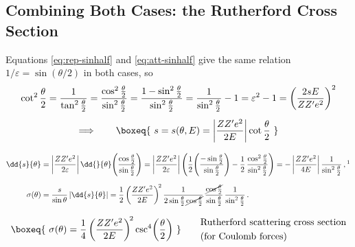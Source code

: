 \documentclass[11pt]{article}
\begin{document}
\subsection{Combining Both Cases: the Rutherford Cross Section}

Equations \eqref{eq:rep-sinhalf} and \eqref{eq:att-sinhalf} give the same
relation $1/\varepsilon = \sin(\theta/2)$ in both cases, so
\begin{gather}
\cot^{2}\frac{\theta}{2} = \frac{1}{\tan^{2}\frac{\theta}{2}}
 = \frac{\cos^{2}\frac{\theta}{2}}{\sin^{2}\frac{\theta}{2}}
 = \frac{1-\sin^{2}\frac{\theta}{2}}{\sin^{2}\frac{\theta}{2}}
 = \frac{1}{\sin^{2}\frac{\theta}{2}} - 1
 = \varepsilon^{2} - 1
 = \left(\frac{2sE}{Z Z' e^{2}}\right)^{2}\\[4pt]
\Longrightarrow\qquad
\boxeq{\ s = s(\theta,E) = \left\lvert \frac{Z Z' e^{2}}{2E}\right\rvert
   \cot\frac{\theta}{2}\ }
\label{eq:s-of-theta}
\end{gather}

\begin{align}
\dd{s}{\theta}
 &= \left\lvert \frac{Z Z' e^{2}}{2\varepsilon}\right\rvert
    \dd{}{\theta}\!\left(\frac{\cos\frac{\theta}{2}}{\sin\frac{\theta}{2}}\right)
  = \left\lvert \frac{Z Z' e^{2}}{2\varepsilon}\right\rvert
    \left(\frac{1}{2}\!\left(\frac{-\sin\frac{\theta}{2}}{\sin\frac{\theta}{2}}\right)
      - \frac{1}{2}\,\frac{\cos^{2}\frac{\theta}{2}}{\sin^{2}\frac{\theta}{2}}\right)
  = -\left\lvert \frac{Z Z' e^{2}}{4E}\right\rvert
    \frac{1}{\sin^{2}\frac{\theta}{2}}\,,\footnotemark\\[6pt]
\sigma(\theta)
 &= \frac{s}{\sin\theta}\left\lvert \dd{s}{\theta}\right\rvert
  = \frac{1}{2}\left(\frac{Z Z' e^{2}}{2E}\right)^{\!2}
    \frac{1}{2\sin\frac{\theta}{2}\,\cancel{\cos\frac{\theta}{2}}}\,
    \frac{\cancel{\cos\frac{\theta}{2}}}{\sin\frac{\theta}{2}}\,
    \frac{1}{\sin^{2}\frac{\theta}{2}}\,.
\end{align}

\begin{equation}
\boxeq{\ \sigma(\theta) = \frac{1}{4}\left(\frac{Z Z' e^{2}}{2E}\right)^{\!2}
  \csc^{4}\!\left(\frac{\theta}{2}\right)\ }
\qquad
\begin{aligned}
&\text{Rutherford scattering cross section}\\
&\text{(for Coulomb forces)}
\end{aligned}
\label{eq:rutherford}
\end{equation}
\end{document}
